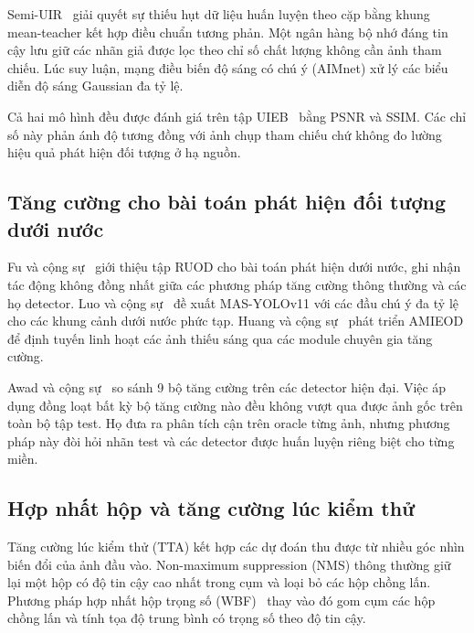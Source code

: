 \documentclass[runningheads]{llncs}
\begin{document}
Semi-UIR~\cite{huangContrastiveSemisupervisedLearning2023} giải quyết sự thiếu hụt dữ liệu huấn luyện theo cặp bằng khung mean-teacher kết hợp điều chuẩn tương phản. Một ngân hàng bộ nhớ đáng tin cậy lưu giữ các nhãn giả được lọc theo chỉ số chất lượng không cần ảnh tham chiếu. Lúc suy luận, mạng điều biến độ sáng có chú ý (AIMnet) xử lý các biểu diễn độ sáng Gaussian đa tỷ lệ.

Cả hai mô hình đều được đánh giá trên tập UIEB~\cite{liUnderwaterImageEnhancement2019} bằng PSNR và SSIM. Các chỉ số này phản ánh độ tương đồng với ảnh chụp tham chiếu chứ không đo lường hiệu quả phát hiện đối tượng ở hạ nguồn.

\subsection{Tăng cường cho bài toán phát hiện đối tượng dưới nước}

Fu và cộng sự~\cite{fuRethinkingGeneralUnderwater2023} giới thiệu tập RUOD cho bài toán phát hiện dưới nước, ghi nhận tác động không đồng nhất giữa các phương pháp tăng cường thông thường và các họ detector. Luo và cộng sự~\cite{luoMASYOLOv11ImprovedUnderwater2025} đề xuất MAS-YOLOv11 với các đầu chú ý đa tỷ lệ cho các khung cảnh dưới nước phức tạp. Huang và cộng sự~\cite{huangAMIEODAdaptiveMultiExperts2026} phát triển AMIEOD để định tuyến linh hoạt các ảnh thiếu sáng qua các module chuyên gia tăng cường.

Awad và cộng sự~\cite{awadRevisitingUnderwaterImage2026} so sánh 9 bộ tăng cường trên các detector hiện đại. Việc áp dụng đồng loạt bất kỳ bộ tăng cường nào đều không vượt qua được ảnh gốc trên toàn bộ tập test. Họ đưa ra phân tích cận trên oracle từng ảnh, nhưng phương pháp này đòi hỏi nhãn test và các detector được huấn luyện riêng biệt cho từng miền.

\subsection{Hợp nhất hộp và tăng cường lúc kiểm thử}

Tăng cường lúc kiểm thử (TTA) kết hợp các dự đoán thu được từ nhiều góc nhìn biến đổi của ảnh đầu vào. Non-maximum suppression (NMS) thông thường giữ lại một hộp có độ tin cậy cao nhất trong cụm và loại bỏ các hộp chồng lấn. Phương pháp hợp nhất hộp trọng số (WBF)~\cite{solovyevWeightedBoxesFusion2021} thay vào đó gom cụm các hộp chồng lấn và tính tọa độ trung bình có trọng số theo độ tin cậy.
\end{document}
